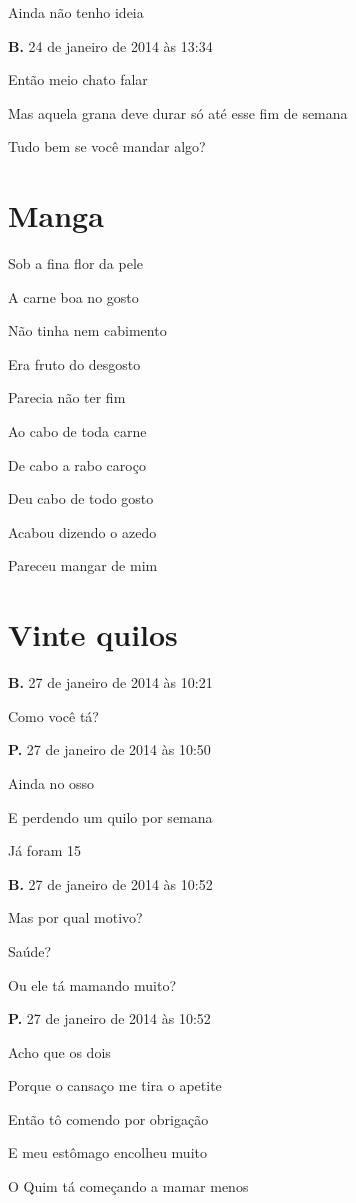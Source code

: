 {{Ainda não tenho ideia

\textbf{B.} 24 de janeiro de 2014 às 13:34

Então meio chato falar

Mas aquela grana deve durar só até esse fim de semana

Tudo bem se você mandar algo?


\chapter{Manga}\label{manga}

Sob a fina flor da pele

A carne boa no gosto

Não tinha nem cabimento

Era fruto do desgosto

Parecia não ter fim\medskip

Ao cabo de toda carne

De cabo a rabo caroço

 Deu cabo de todo gosto

Acabou dizendo o azedo

Pareceu mangar de mim




\chapter{Vinte quilos}

\textbf{B.} 27 de janeiro de 2014 às 10:21

Como você tá?

\textbf{P.} 27 de janeiro de 2014 às 10:50

Ainda no osso

E perdendo um quilo por semana

Já foram 15

\textbf{B.} 27 de janeiro de 2014 às 10:52

Mas por qual motivo?

Saúde?

Ou ele tá mamando muito?

\textbf{P.} 27 de janeiro de 2014 às 10:52

Acho que os dois

Porque o cansaço me tira o apetite

Então tô comendo por obrigação

E meu estômago encolheu muito

O Quim tá começando a mamar menos

}}
